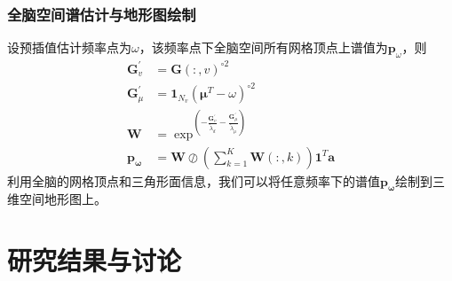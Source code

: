 \subsubsection{全脑空间谱估计与地形图绘制}
设预插值估计频率点为$\omega$，该频率点下全脑空间所有网格顶点上谱值为$\mathbf{p}_\omega$，则
\begin{equation}\label{eq16}
\begin{split}
\mathbf{G}^\prime_v& = \mathbf{G}(:,v)^{\circ2}\\
\mathbf{G}^\prime_\mu& = \mathbf{1}_{N_v}(\mathbf{\mu}^T-\omega)^{\circ2}\\
\mathbf{W}& =\exp^{(-\frac{\mathbf{G}^\prime_v}{\tilde{\lambda}_d}-\frac{\mathbf{G}^\prime_\mu}{\tilde{\lambda}_\mu})}\\
\mathbf{p_\omega}& =\mathbf{W}\oslash{(\sum_{k=1}^K\mathbf{W}(:,k))\mathbf{1}^T}\mathbf{a}
\end{split}
\end{equation}
利用全脑的网格顶点和三角形面信息，我们可以将任意频率下的谱值$\mathbf{p_\omega}$绘制到三维空间地形图上。

\section{研究结果与讨论}
